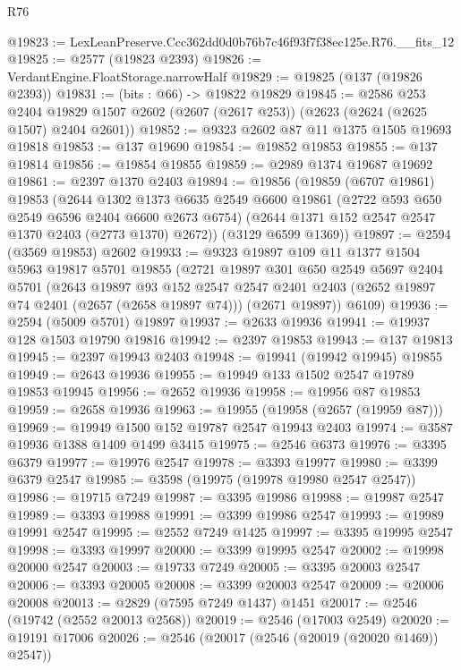 \begin{lexlean}{R76}
\begin{coremodule}
@19823 := LexLeanPreserve.Ccc362dd0d0b76b7c46f93f7f38ec125e.R76.__fits_12
@19825 := @2577 (@19823 @2393)
@19826 := VerdantEngine.FloatStorage.narrowHalf
@19829 := @19825 (@137 (@19826 @2393))
@19831 := (bits : @66) -> @19822 @19829
@19845 := @2586
    @253
    @2404
    @19829
    @1507
    @2602
    (@2607 (@2617 @253))
    (@2623 (@2624 (@2625 @1507) @2404 @2601))
@19852 := @9323 @2602 @87 @11 @1375 @1505 @19693 @19818
@19853 := @137 @19690
@19854 := @19852 @19853
@19855 := @137 @19814
@19856 := @19854 @19855
@19859 := @2989 @1374 @19687 @19692
@19861 := @2397 @1370 @2403
@19894 := @19856
    (@19859
      (@6707 @19861)
      @19853
      (@2644
        @1302
        @1373
        @6635
        @2549
        @6600
        @19861
        (@2722 @593 @650 @2549 @6596 @2404 @6600 @2673 @6754)
        (@2644 @1371 @152 @2547 @2547 @1370 @2403 (@2773 @1370) @2672))
      (@3129 @6599 @1369))
@19897 := @2594 (@3569 @19853) @2602
@19933 := @9323
    @19897
    @109
    @11
    @1377
    @1504
    @5963
    @19817
    @5701
    @19855
    (@2721
      @19897
      @301
      @650
      @2549
      @5697
      @2404
      @5701
      (@2643
        @19897
        @93
        @152
        @2547
        @2547
        @2401
        @2403
        (@2652 @19897 @74 @2401 (@2657 (@2658 @19897 @74)))
        (@2671 @19897))
      @6109)
@19936 := @2594 (@5009 @5701) @19897
@19937 := @2633 @19936
@19941 := @19937 @128 @1503 @19790 @19816
@19942 := @2397 @19853
@19943 := @137 @19813
@19945 := @2397 @19943 @2403
@19948 := @19941 (@19942 @19945) @19855
@19949 := @2643 @19936
@19955 := @19949 @133 @1502 @2547 @19789 @19853 @19945
@19956 := @2652 @19936
@19958 := @19956 @87 @19853
@19959 := @2658 @19936
@19963 := @19955 (@19958 (@2657 (@19959 @87)))
@19969 := @19949 @1500 @152 @19787 @2547 @19943 @2403
@19974 := @3587 @19936 @1388 @1409 @1499 @3415
@19975 := @2546 @6373
@19976 := @3395 @6379
@19977 := @19976 @2547
@19978 := @3393 @19977
@19980 := @3399 @6379 @2547
@19985 := @3598 (@19975 (@19978 @19980 @2547 @2547))
@19986 := @19715 @7249
@19987 := @3395 @19986
@19988 := @19987 @2547
@19989 := @3393 @19988
@19991 := @3399 @19986 @2547
@19993 := @19989 @19991 @2547
@19995 := @2552 @7249 @1425
@19997 := @3395 @19995 @2547
@19998 := @3393 @19997
@20000 := @3399 @19995 @2547
@20002 := @19998 @20000 @2547
@20003 := @19733 @7249
@20005 := @3395 @20003 @2547
@20006 := @3393 @20005
@20008 := @3399 @20003 @2547
@20009 := @20006 @20008
@20013 := @2829 (@7595 @7249 @1437) @1451
@20017 := @2546 (@19742 (@2552 @20013 @2568))
@20019 := @2546 (@17003 @2549)
@20020 := @19191 @17006
@20026 := @2546 (@20017 (@2546 (@20019 (@20020 @1469)) @2547))

\end{coremodule}
\end{lexlean}
